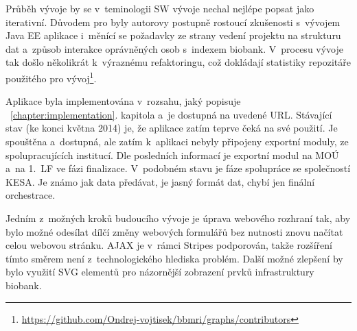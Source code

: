 \documentclass[11pt, final, oneside]{fithesis2}
\begin{document}
Průběh vývoje by se v~teminologii SW vývoje nechal nejlépe popsat jako iterativní. Důvodem pro  byly autorovy postupně rostoucí zkušenosti s~vývojem Java EE aplikace i~měnící se požadavky ze strany vedení projektu na strukturu dat a~způsob interakce oprávněných osob s~indexem biobank. V~procesu vývoje tak došlo několikrát k~výraznému refaktoringu, což dokládají statistiky repozitáře použitého pro vývoj\footnote{\url{https://github.com/Ondrej-vojtisek/bbmri/graphs/contributors}}.

Aplikace byla implementována v~rozsahu, jaký popisuje ~\ref{chapter:implementation}. kapitola a~je dostupná na uvedené URL. Stávající stav (ke konci května 2014) je, že aplikace zatím teprve čeká na své  použití. Je spouštěna a~dostupná, ale zatím k~aplikaci nebyly připojeny exportní moduly, ze spolupracujících institucí. Dle posledních informací je exportní modul na MOÚ a~na 1.~LF ve fázi finalizace. V~podobném stavu je fáze spolupráce se společností KESA. Je známo jak data předávat, je jasný formát dat, chybí jen finální orchestrace. 

Jedním z~možných kroků budoucího vývoje je úprava webového rozhraní tak, aby bylo možné odesílat dílčí změny webových formulářů bez nutnosti znovu načítat celou webovou stránku. AJAX je v~rámci Stripes podporován, takže rozšíření tímto směrem není z~technologického hlediska problém. Další možné zlepšení by bylo využití SVG elementů pro názornější zobrazení prvků infrastruktury biobank. 




\renewcommand{\UrlBreaks}{\do\/\do\a\do\b\do\c\do\e\do\f\do\i\do\j\do\k\do\l\do\m\do\n\do\o\do\q\do\r\do\s\do\u\do\v\do\w\do\x\do\y\do\z\do\A\do\B\do\C\do\D\do\E\do\F\do\G\do\H\do\I\do\J\do\K\do\L\do\M\do\N\do\O\do\P\do\Q\do\R\do\S\do\T\do\U\do\V\do\W\do\X\do\Y\do\Z\do\?\do\=\do\-\do\0\do\1\do\3\do\4\do\5\do\6\do\7\do\8\do\9\do\p\do\d\do\h}
\mathchardef{}\relax
\end{document}
